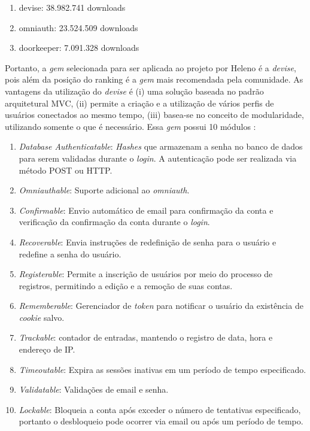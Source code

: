 \begin{enumerate}
	\item devise: 38.982.741 downloads
	\item omniauth: 23.524.509 downloads
	\item doorkeeper: 7.091.328 downloads
\end{enumerate}

Portanto, a \textit{gem} selecionada para ser aplicada ao projeto por Heleno é a \textit{devise}, pois além da posição do ranking é a \textit{gem} mais recomendada pela comunidade. As vantagens da utilização do \textit{devise} é  (i) uma solução baseada no padrão arquitetural MVC, (ii) permite a criação e a utilização de vários perfis de usuários conectados ao mesmo tempo, (iii) basea-se no conceito de modularidade, utilizando somente o que é necessário. Essa \textit{gem} possui 10 módulos \cite{gemdevise}: 

\begin{enumerate}
	\item \textit{Database Authenticatable}: \textit{Hashes} que armazenam a senha no banco de dados para serem validadas durante o \textit{login}. A autenticação pode ser realizada via método POST ou HTTP. 
	\item \textit{Omniauthable}: Suporte adicional ao \textit{omniauth}.
	\item \textit{Confirmable}: Envio automático de email para confirmação da conta e verificação da confirmação da conta durante o \textit{login}.
	\item \textit{Recoverable}: Envia instruções de redefinição de senha para o usuário e redefine a senha do usuário.
	\item \textit{Registerable}: Permite a inscrição de usuários por meio do processo de registros, permitindo a edição e a remoção de suas contas.
	\item \textit{Rememberable}: Gerenciador de \textit{token} para notificar o usuário da existência de \textit{cookie} salvo.
	\item \textit{Trackable}: contador de entradas, mantendo o registro de data, hora e endereço de IP.
	\item \textit{Timeoutable}: Expira as sessões inativas em um período de tempo especificado. 
	\item \textit{Validatable}: Validações de email e senha. 
	\item \textit{Lockable}: Bloqueia a conta após exceder o número de tentativas especificado, portanto o desbloqueio pode ocorrer via email ou após um período de tempo. 
\end{enumerate}

